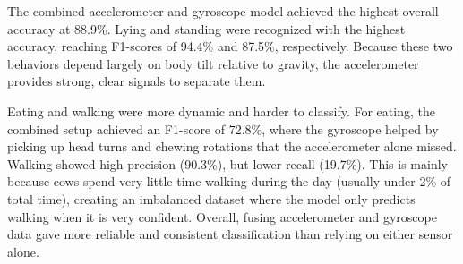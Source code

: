 \documentclass[conference]{IEEEtran}
\begin{document}
The combined accelerometer and gyroscope model achieved the highest overall accuracy at 88.9\%. Lying and standing were recognized with the highest accuracy, reaching F1-scores of 94.4\% and 87.5\%, respectively. Because these two behaviors depend largely on body tilt relative to gravity, the accelerometer provides strong, clear signals to separate them.

Eating and walking were more dynamic and harder to classify. For eating, the combined setup achieved an F1-score of 72.8\%, where the gyroscope helped by picking up head turns and chewing rotations that the accelerometer alone missed. Walking showed high precision (90.3\%), but lower recall (19.7\%). This is mainly because cows spend very little time walking during the day (usually under 2\% of total time), creating an imbalanced dataset where the model only predicts walking when it is very confident. Overall, fusing accelerometer and gyroscope data gave more reliable and consistent classification than relying on either sensor alone.
\end{document}
